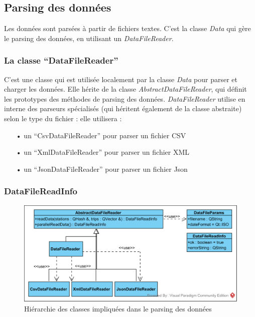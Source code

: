 \documentclass[12pt]{article}
\begin{document}
		\subsection{Parsing des données}
		Les données sont parsées à partir de fichiers textes. C’est la classe \textit{Data} qui
		gère le parsing des données, en utilisant un \textit{DataFileReader}.
					
		\subsubsection{La classe “DataFileReader”}
	C’est une classe qui est utilisée localement par la classe \textit{Data} pour parser et charger les données. Elle hérite de la classe \textit{AbstractDataFileReader}, qui définit les prototypes des méthodes de parsing des données. \textit{DataFileReader} utilise en interne des parseurs spécialisés (qui héritent également de la classe abstraite) selon le type du fichier : elle utilisera :\\
	
		\begin{itemize}
			\item[•]un “CsvDataFileReader” pour parser un fichier CSV
			\item[•]un “XmlDataFileReader” pour parser un fichier XML
			\item[•]un “JsonDataFileReader” pour parser un fichier Json\\
		\end{itemize}
	
	
		\subsubsection{DataFileReadInfo}
		\begin{figure}[!h]
		\begin{center}
		\includegraphics[scale=1]{dia_class_parsing.png}
		\caption{Hiérarchie des classes impliquées dans le parsing des données}
		\end{center}
		\end{figure}
			
\end{document}
